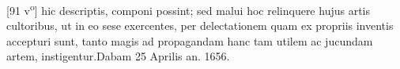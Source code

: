 [91 v\textsuperscript{o}]  hic descriptis, componi possint; sed malui hoc relinquere  hujus artis cultoribus, ut in eo sese exercentes, per  delectationem quam ex propriis inventis accepturi sunt,  tanto magis ad propagandam hanc tam utilem ac jucundam  artem, instigentur.\pend \pstart  Dabam 25 Aprilis an. 1656. \pend 
